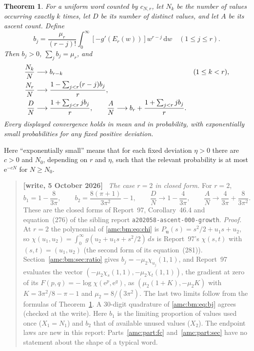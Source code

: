 \documentclass[11pt,letterpaper]{article}
\newtheorem{theorem}{Theorem}[section]
\theoremstyle{remark}\newtheorem{remark}[theorem]{Remark}
\newcommand{\ee}{\mathrm e}
\newcommand{\dd}{\,\mathrm d}
\newcommand{\bu}{\boldsymbol u}
\newenvironment{writenotedated}[1]{\par\smallskip\begin{quote}\small\textbf{[write, #1]}\ }{\end{quote}\smallskip}
\newcommand{\repopath}[1]{\nolinkurl{#1}}
\begin{document}
\begin{theorem}\label{amc:bm:thm:endpoints}
For a uniform word counted by $c_{N,r}$, let $N_k$ be the number of values occurring exactly $k$ times, let $D$ be its number of distinct values, and let $A$ be its ascent count. Define
\begin{equation}\label{amc:bm:eq:bj}
 b_j=\frac{\mu_r}{(r-j)!}\int_0^\infty[-g'(E_r(w))]w^{r-j}\dd w
 \quad(1\le j\le r).
\end{equation}
Then $b_j>0$, $\sum_jb_j=\mu_r$, and
\begin{align}
 \frac{N_k}{N}&\longrightarrow b_{r-k} &&(1\le k<r),\label{amc:bm:eq:multlimits}\\
 \frac{N_r}{N}&\longrightarrow\frac{1-\sum_{j<r}(r-j)b_j}{r},\notag\\
 \frac DN&\longrightarrow\frac{1+\sum_{j<r}jb_j}{r},\qquad
 \frac AN\longrightarrow b_r+\frac{1+\sum_{j<r}jb_j}{r}.\notag
\end{align}
Every displayed convergence holds in mean and in probability, with exponentially small probabilities for any fixed positive deviation.
\end{theorem}
Here ``exponentially small'' means that for each fixed deviation $\eta>0$ there are $c>0$ and $N_0$, depending on $r$ and $\eta$, such that the relevant probability is at most $\ee^{-cN}$ for $N\ge N_0$.

\begin{writenotedated}{5 October 2026}
\emph{The case $r=2$ in closed form.} For $r=2$,
\[
 b_1=1-\frac8{3\pi},\qquad b_2=\frac{8(\pi+1)}{3\pi^2}-1,\qquad
 \frac DN\to1-\frac4{3\pi},\qquad \frac AN\to\frac4{3\pi}+\frac8{3\pi^2}.
\]
These are the closed forms of Report~97, Corollary~46.4 and equation~(276) of the sibling report \repopath{a202058-ascent-000-growth}. \emph{Proof.} At $r=2$ the polynomial of \eqref{amc:bm:eq:chi} is $P_{\bu}(s)=s^2/2+u_1s+u_2$, so $\chi(u_1,u_2)=\int_0^\infty g(u_2+u_1s+s^2/2)\,ds$ is Report~97's $\chi(s,t)$ with $(s,t)=(u_1,u_2)$ (the second form of its equation~(281)). Section~\ref{amc:bm:sec:ratio} gives $b_j=-\mu_2\chi_{u_j}(1,1)$, and Report~97 evaluates the vector $(-\mu_2\chi_s(1,1),-\mu_2\chi_t(1,1))$, the gradient at zero of its $F(p,q)=-\log\chi(\ee^p,\ee^q)$, as $(\mu_2(1+K),-\mu_2K)$ with $K=3\pi^2/8-\pi-1$ and $\mu_2=8/(3\pi^2)$. The last two limits follow from the formulas of Theorem~\ref{amc:bm:thm:endpoints}. A 30-digit quadrature of \eqref{amc:bm:eq:bj} agrees (checked at the write). Here $b_1$ is the limiting proportion of values used once ($X_1=N_1$) and $b_2$ that of available unused values ($X_2$). The endpoint laws are new in this report: Parts~\ref{amc:part:fc} and~\ref{amc:part:sec} have no statement about the shape of a typical word.
\end{writenotedated}
\end{document}
